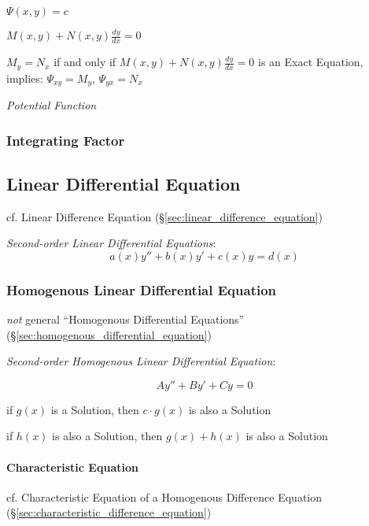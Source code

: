 $\Psi(x,y) = c$

$M(x,y) + N(x,y)\frac{dy}{dx} = 0$

$M_y = N_x$ if and only if $M(x,y) + N(x,y)\frac{dy}{dx} = 0$ is an Exact
Equation, implies: $\Psi_{xy} = M_y$, $\Psi_{yx} = N_x$

\emph{Potential Function}



\subsubsection{Integrating Factor}\label{sec:integrating_factor}



\subsection{Linear Differential Equation}
\label{sec:linear_differential_equation}

cf. Linear Difference Equation (\S\ref{sec:linear_difference_equation})

\emph{Second-order Linear Differential Equations}:
\[
  a(x) y'' + b(x) y' + c(x) y = d(x)
\]



\subsubsection{Homogenous Linear Differential Equation}
\label{sec:homogenous_linear_differential}

\emph{not} general ``Homogenous Differential Equations''
(\S\ref{sec:homogenous_differential_equation})

\emph{Second-order Homogenous Linear Differential Equation}:

\[
  A y'' + B y' + C y = 0
\]

if $g(x)$ is a Solution, then $c\cdot{g(x)}$ is also a Solution

if $h(x)$ is also a Solution, then $g(x) + h(x)$ is also a Solution



\paragraph{Characteristic Equation}\label{sec:characteristic_equation}\hfill

cf. Characteristic Equation of a Homogenous Difference Equation
(\S\ref{sec:characteristic_difference_equation})

